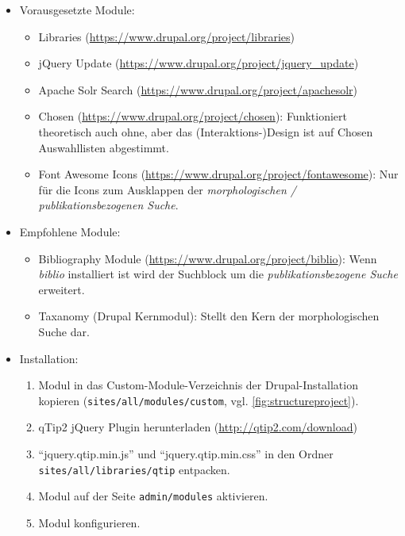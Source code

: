 \begin{itemize}[parsep=0pt, itemsep=5.0pt plus 2.0pt minus 1.0pt, leftmargin=*]
	\item Vorausgesetzte Module:
	\begin{itemize}
		\item Libraries (\url{https://www.drupal.org/project/libraries})
		\item jQuery Update (\url{https://www.drupal.org/project/jquery_update})
		\item Apache Solr Search (\url{https://www.drupal.org/project/apachesolr})
		\item Chosen (\url{https://www.drupal.org/project/chosen}): Funktioniert theoretisch auch ohne, aber das (Interaktions-)Design ist auf Chosen Auswahllisten abgestimmt.  
		\item Font Awesome Icons (\url{https://www.drupal.org/project/fontawesome}): Nur für die Icons zum Ausklappen der \textit{morphologischen / publikationsbezogenen Suche}.
	\end{itemize}
	
	\item Empfohlene Module:
	\begin{itemize}
		\item Bibliography Module (\url{https://www.drupal.org/project/biblio}): Wenn \textit{biblio} installiert ist wird der Suchblock um die \textit{publikationsbezogene Suche} erweitert.
		\item Taxanomy (Drupal Kernmodul): Stellt den Kern der morphologischen Suche dar.
	\end{itemize}

	\item Installation: 
	\begin{enumerate}
		\item Modul in das Custom-Module-Verzeichnis der Drupal-Installation kopieren  (\zB \lstinline|sites/all/modules/custom|, vgl. \cref{fig:structureproject}).
		\item qTip2 jQuery Plugin herunterladen (\url{http://qtip2.com/download}) 
		\item \enquote{jquery.qtip.min.js} und \enquote{jquery.qtip.min.css} in den Ordner \lstinline|sites/all/libraries/qtip| entpacken.
		\item Modul auf der Seite \lstinline|admin/modules| aktivieren.
		\item Modul konfigurieren.
		
	\end{enumerate}
	

\end{itemize}
